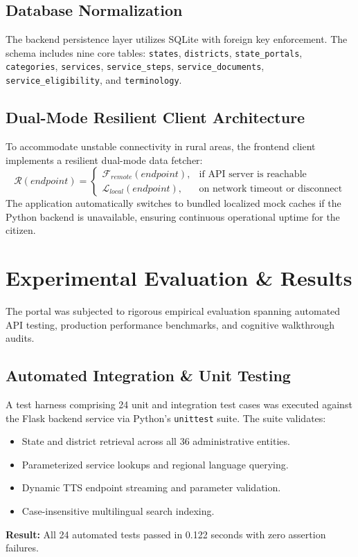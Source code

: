 \documentclass[conference]{IEEEtran}
\begin{document}
\subsection{Database Normalization}
The backend persistence layer utilizes SQLite with foreign key enforcement. The schema includes nine core tables: \texttt{states}, \texttt{districts}, \texttt{state\_portals}, \texttt{categories}, \texttt{services}, \texttt{service\_steps}, \texttt{service\_documents}, \texttt{service\_eligibility}, and \texttt{terminology}. 

\subsection{Dual-Mode Resilient Client Architecture}
To accommodate unstable connectivity in rural areas, the frontend client implements a resilient dual-mode data fetcher:
\begin{equation}
\mathcal{R}(endpoint) = \begin{cases} 
\mathcal{F}_{remote}(endpoint), & \text{if API server is reachable} \\
\mathcal{L}_{local}(endpoint), & \text{on network timeout or disconnect}
\end{cases}
\end{equation}
The application automatically switches to bundled localized mock caches if the Python backend is unavailable, ensuring continuous operational uptime for the citizen.

\section{Experimental Evaluation \& Results}
The portal was subjected to rigorous empirical evaluation spanning automated API testing, production performance benchmarks, and cognitive walkthrough audits.

\subsection{Automated Integration \& Unit Testing}
A test harness comprising 24 unit and integration test cases was executed against the Flask backend service via Python's \texttt{unittest} suite. The suite validates:
\begin{itemize}
    \item State and district retrieval across all 36 administrative entities.
    \item Parameterized service lookups and regional language querying.
    \item Dynamic TTS endpoint streaming and parameter validation.
    \item Case-insensitive multilingual search indexing.
\end{itemize}
\textbf{Result:} All 24 automated tests passed in 0.122 seconds with zero assertion failures.
\end{document}
